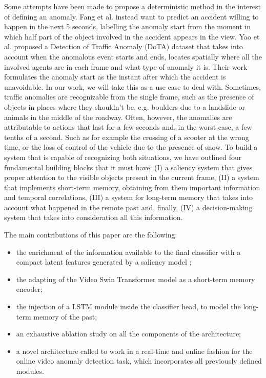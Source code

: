 Some attempts have been made to propose a deterministic method in the interest of defining an anomaly.
Fang et al. \cite{fang2019dada} instead want to predict an accident willing to happen in the next 5 seconds, labelling the anomaly start from the moment in which half part of the object involved in the accident appears in the view.
Yao et al. \cite{yao2020when} proposed a Detection of Traffic Anomaly (DoTA) dataset that takes into account when the anomalous event starts and ends, locates spatially where all the involved agents are in each frame and what type of anomaly it is.
Their work formulates the anomaly start as the instant after which the accident is unavoidable.
In our work, we will take this as a use case to deal with.
Sometimes, traffic anomalies are recognizable from the single frame, such as the presence of objects in places where they shouldn't be, e.g. boulders due to a landslide or animals in the middle of the roadway.
Often, however, the anomalies are attributable to actions that last for a few seconds and, in the worst case, a few tenths of a second.
Such as for example the crossing of a scooter at the wrong time, or the loss of control of the vehicle due to the presence of snow.
To build a system that is capable of recognizing both situations, we have outlined four fundamental building blocks that it must have: (I) a saliency system that gives proper attention to the visible objects present in the current frame, (II) a system that implements short-term memory, obtaining from them important information and temporal correlations, (III) a system for long-term memory that takes into account what happened in the remote past and, finally, (IV) a decision-making system that takes into consideration all this information.

The main contributions of this paper are the following:
\begin{itemize}
    \item the enrichment of the information available to the final classifier with a compact latent features generated by a saliency model \cite{cornia2016deep};
    \item the adapting of the Video Swin Transformer model \cite{liu_video_2022} as a short-term memory encoder;
    \item the injection of a LSTM module inside the classifier head, to model the long-term memory of the past;
    \item an exhaustive ablation study on all the components of the architecture;
    \item a novel architecture called  to work in a real-time and online fashion for the online video anomaly detection task, which incorporates all previously defined modules.
\end{itemize}

